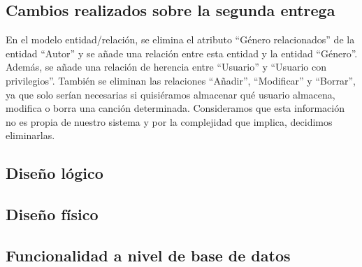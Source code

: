 \subsection{Cambios realizados sobre la segunda entrega}

En el modelo entidad/relación, se elimina el atributo ``Género relacionados'' de la entidad ``Autor'' y se añade una relación entre esta entidad y la entidad ``Género''. Además, se añade una relación de herencia entre ``Usuario'' y ``Usuario con privilegios''. También se eliminan las relaciones ``Añadir'', ``Modificar'' y ``Borrar'', ya que solo serían necesarias si quisiéramos almacenar qué usuario almacena, modifica o borra una canción determinada. Consideramos que esta información no es propia de nuestro sistema y por la complejidad que implica, decidimos eliminarlas.

\subsection{Diseño lógico}

\subsection{Diseño físico}

\subsection{Funcionalidad a nivel de base de datos}
